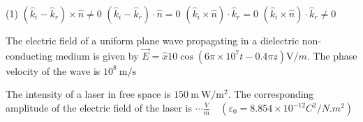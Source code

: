 \begin{enumerate}
\begin{minipage}{\textwidth}
\end{minipage}
\begin{tasks}(1)
	\task[\textbf{A.}] $\left(\hat{k}_{i}-\hat{k}_{r}\right) \times \hat{n} \neq 0$
	\task[\textbf{B.}]$\left(\hat{k}_{i}-\hat{k}_{r}\right) \cdot \hat{n}=0$
	\task[\textbf{C.}]$\left(\hat{k}_{i} \times \hat{n}\right) \cdot \hat{k}_{r}=0$
	\task[\textbf{D.}]$\left(\hat{k}_{i} \times \hat{n}\right) \cdot \hat{k}_{r} \neq 0$
\end{tasks}
\begin{minipage}{\textwidth}
	\item The electric field of a uniform plane wave propagating in a dielectric non-conducting medium is given by $\vec{E}=\hat{x} 10 \cos \left(6 \pi \times 10^{7} t-0.4 \pi z\right) \mathrm{V} / m$. The phase velocity of the wave is $10^{8} \mathrm{~m} / \mathrm{s}$ 
\end{minipage}
\begin{minipage}{\textwidth}
	\item The intensity of a laser in free space is $150 \mathrm{~m} \mathrm{~W} / \mathrm{m}^{2}$. The corresponding amplitude of the electric field of the laser is $\cdots\frac{V}{m} \quad\left(\varepsilon_{0}=8.854 \times 10^{-12} C^{2} / N . m^{2}\right)$
\end{minipage}


\end{enumerate}
